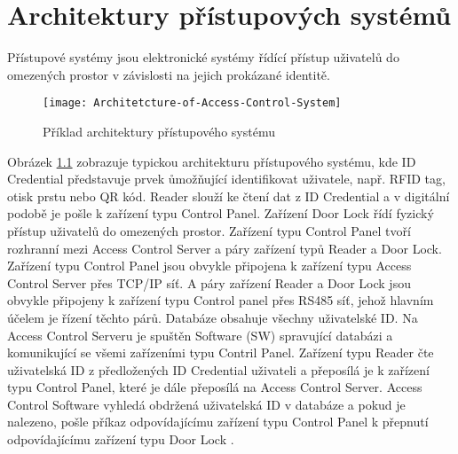 \chapter{Architektury přístupových systémů}
Přístupové systémy jsou elektronické systémy řídící přístup uživatelů do omezených prostor v závislosti na jejich prokázané identitě.
 
\begin{figure}[!h]
    \centering
    \texttt{[image: Architetcture-of-Access-Control-System]}
    \caption{Příklad architektury přístupového systému \cite{accessControlSystem_eiprocus}}
    \label{fig:Access control system architecture}
\end{figure}

Obrázek \ref{fig:Access control system architecture} zobrazuje typickou architekturu přístupového systému, kde ID Credential představuje prvek ůmožňující identifikovat uživatele, např. RFID tag, otisk prstu nebo QR kód. 
Reader slouží ke čtení dat z ID Credential a v digitální podobě je pošle k zařízení typu Control Panel.
Zařízení Door Lock řídí fyzický přístup uživatelů do omezených prostor. 
Zařízení typu Control Panel tvoří rozhranní mezi Access Control Server a páry zařízení typů Reader a Door Lock. 
Zařízení typu Control Panel jsou obvykle připojena 
k zařízení typu Access Control Server přes TCP/IP síť.
A páry zařízení Reader a Door Lock jsou obvykle připojeny k zařízení typu Control panel přes RS485 síť, jehož hlavním účelem je řízení těchto párů. Databáze obsahuje všechny uživatelské ID.
Na Access Control Serveru je spuštěn Software (SW) spravující databázi a komunikující se všemi zařízeními typu Contril Panel.
Zařízení typu Reader čte uživatelská ID z předložených ID Credential uživateli a přeposílá je k zařízení typu Control Panel, které je dále přeposílá na Access Control Server. Access Control Software vyhledá obdržená uživatelská ID v databáze a pokud je nalezeno, pošle příkaz odpovídajícímu zařízení typu Control Panel k přepnutí odpovídajícímu zařízení typu Door Lock \cite{accessControlSystem_eiprocus}.
